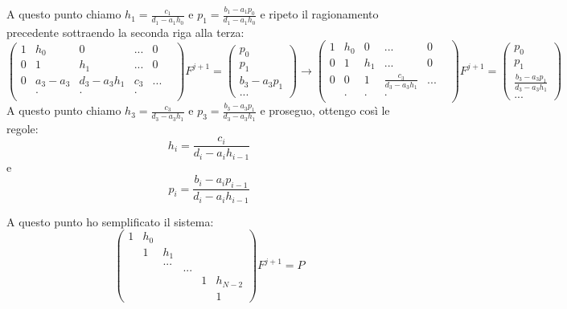 \documentclass[]{article}
\newcommand{\lr}[3]{\ensuremath{\left#1 #3 \right#2}}
\newcommand{\lrt}[1]{\lr{(}{)}{#1}}
\numberwithin{equation}{subsection}
\begin{document}
A questo punto chiamo $h_1 = \frac{c_1}{d_1 -a_1 h_0}$ e $p_1=\frac{b_1-a_1p_0}{d_1 -a_1 h_0}$ e ripeto il ragionamento precedente sottraendo la seconda riga alla terza:
\begin{equation}
\lrt{\begin{array}{cccccc}
1&h_0&0&...&0\\
0 &1&h_1&...&0\\
0&a_3-a_3&d_3-a_3 h_1&c_3&...\\
&.&.&.&&\\
\end{array}} F^{j+1} = \lrt{\begin{array}{c}
p_0\\p_1\\b_3 -a_3 p_1\\...
\end{array}} \to
\lrt{\begin{array}{cccccc}
1&h_0&0&...&0\\
0 &1&h_1&...&0\\
0&0&1&\frac{c_3}{d_3-a_3 h_1}&...\\
&.&.&.&&\\
\end{array}} F^{j+1} = \lrt{\begin{array}{c}
p_0\\p_1\\\frac{b_3 -a_3 p_1}{d_3-a_3 h_1}\\...
\end{array}}
\end{equation}
A questo punto chiamo $h_3 = \frac{c_3}{d_3 -a_3 h_1}$ e $p_3=\frac{b_3-a_3p_1}{d_3 -a_3 h_1}$ e proseguo, ottengo cos\`i le regole:
\begin{equation}\label{eq:hi}
h_i = \frac{c_i}{d_i -a_i h_{i-1}}
\end{equation}
e
\begin{equation}\label{eq:pi}
p_i=\frac{b_i-a_ip_{i-1}}{d_i -a_i h_{i-1}}
\end{equation}

A questo punto ho semplificato il sistema:
\begin{equation}\end{equation}
$$\lrt{\begin{array}{cccccc}
1&h_0&&&\\
&1&h_1&\\
&&...&&&\\
&&&...&&\\
&&&&1&h_{N-2}\\
&&&&&1
\end{array}}F^{j+1} = P$$
\begin{equation}\end{equation}
\end{document}
